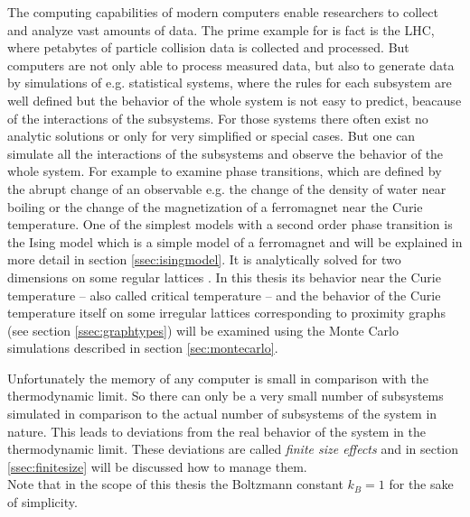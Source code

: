 The computing capabilities of modern computers enable researchers to
collect and analyze vast amounts of data. The prime example for is fact
is the LHC, where petabytes of particle collision data is collected and
processed. But computers are not only able to process measured data, but
also to generate data by simulations of e.g. statistical systems, where
the rules for each subsystem are well defined but the behavior of the
whole system is not easy to predict, beacause of the interactions of the
subsystems. For those systems there often exist no analytic solutions
or only for very simplified or special cases. But one can simulate all
the interactions of the subsystems and observe the behavior of the whole
system.
For example to examine phase transitions, which are defined by the abrupt
change of an observable e.g. the change of the density of water near
boiling or the change of the magnetization of a ferromagnet near the
Curie temperature. One of the simplest models with a second order
phase transition is the Ising model \cite{Ising1925} which is a simple
model of a ferromagnet and will be explained in more detail in section
\ref{ssec:isingmodel}. It is analytically solved for two dimensions on
some regular lattices \cite{Onsager1944} \cite{Wannier1945}.
In this thesis its behavior near the Curie temperature -- also called
critical temperature -- and the behavior of the Curie temperature itself
on some irregular lattices corresponding to proximity graphs
(see section \ref{ssec:graphtypes}) will be examined using the Monte
Carlo simulations described in section \ref{sec:montecarlo}.

Unfortunately the memory of any computer is small in comparison with the
thermodynamic limit. So there can only be a very small number of
subsystems simulated in comparison to the actual number of subsystems
of the system in nature. This leads to deviations from the real behavior
of the system in the thermodynamic limit. These deviations are called
\emph{finite size effects} and in section \ref{ssec:finitesize} will be
discussed how to manage them.\\

Note that in the scope of this thesis the Boltzmann constant \(k_{B}=1\)
for the sake of simplicity.
